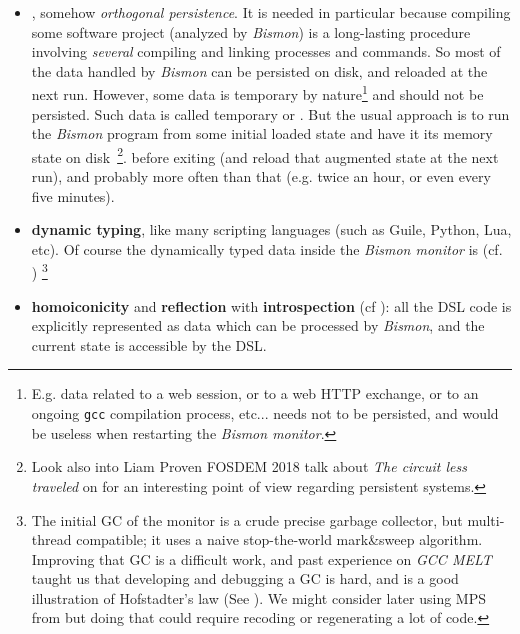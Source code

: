 \begin{itemize}

  \item {}, somehow
    \textit{orthogonal persistence}. It is needed in particular
    because compiling some software project (analyzed by
    \textit{Bismon}) is a long-lasting procedure involving
    \textit{several} compiling and linking processes and commands. So
    most of the data handled by \textit{Bismon} can be persisted on
    disk, and reloaded at the next run. However, some data is
    temporary by nature\footnote{E.g. data related to a web session,
      or to a web HTTP exchange, or to an ongoing \texttt{gcc}
      compilation process, etc... needs not to be persisted, and would
      be useless when restarting the \textit{Bismon monitor}.} and
    should not be persisted. Such data is called temporary or
    . But the usual approach is
    to run the \textit{Bismon} program from some initial loaded state
    and have it  its memory state on
    disk~\footnote{Look also into Liam Proven FOSDEM 2018 talk about
      \emph{The circuit less traveled} on
      for an interesting point of view regarding persistent systems.}.
    before exiting (and reload that augmented state at the next run),
    and probably more often than that (e.g. twice an hour, or even
    every five minutes).

  \item \textbf{dynamic typing}, like many scripting languages (such
    as Guile, Python, Lua, etc). Of course the dynamically typed data
    inside the \textit{Bismon monitor} is 
    (cf. \cite{Jones:2011:GC-handbook})
    \footnote{\label{fn:initial-gc}The initial GC of the monitor is a crude precise garbage
      collector, but multi-thread compatible; it uses a naive
      stop-the-world mark\&sweep algorithm. Improving that GC is a
      difficult work, and past experience on \emph{GCC MELT} taught us
      that developing and debugging a GC is hard, and is a good
      illustration of Hofstadter's law (See
      \cite{Hofstadter:1979:GEB}). We might consider later using MPS
      from  but doing
      that could require recoding or regenerating a lot of code.}

  \item \textbf{homoiconicity} and \textbf{reflection} with
    \textbf{introspection} (cf \cite{Pitrat:1996:FGCS,
      Pitrat:1990:Metaconnaissances, Pitrat:2009:AST,
      Pitrat:2009:ArtifBeings}): all the DSL code is explicitly
    represented as data which can be processed by \textit{Bismon}, and
    the current state is accessible by the DSL.


\end{itemize}
